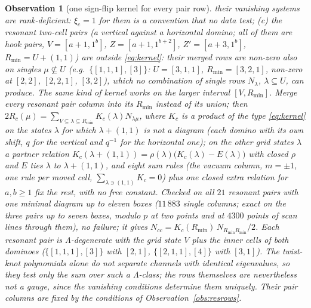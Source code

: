 \documentclass[11pt]{article}
\newtheorem{observation}{Observation}
\newcommand{\Lam}{\Lambda}
\begin{document}
\begin{observation}[one sign-flip kernel for every pair row]
their vanishing systems are rank-deficient: $\xi_c=1$ for them is a convention that no data test; (c) the
\emph{resonant} two-cell pairs (a vertical against a horizontal domino; all of them are hook pairs, $V=[a+1,1^b]$,
$Z=[a+1,1^{b+2}]$, $Z'=[a+3,1^b]$, $R_{\min}=U+(1,1)$) are outside \eqref{eq:kernel}: their merged rows are non-zero also
on singles $\mu\not\subseteq U$ (e.g.\ $\{[1,1,1],[3]\}$: $U=[3,1,1]$, $R_{\min}=[3,2,1]$, non-zero at $[2,2]$, $[2,2,1]$,
$[3,2]$), which no combination of single rows $N_\lambda$, $\lambda\subseteq U$, can produce.  The same kind of kernel
works on the larger interval $[V,R_{\min}]$.  Merge every resonant pair column into its $R_{\min}$ instead of its union;
then $2R_c(\mu)=\sum_{V\subseteq\lambda\subseteq R_{\min}}K_c(\lambda)N_{\lambda\mu}$, where $K_c$ is a product of the type
\eqref{eq:kernel} on the states $\lambda$ for which $\lambda+(1,1)$ is not a diagram (each domino with its own shift, $q$
for the vertical and $q^{-1}$ for the horizontal one); on the other grid states $\lambda$ a partner relation
$K_c(\lambda+(1,1))=\rho(\lambda)\bigl(K_c(\lambda)-E(\lambda)\bigr)$ with closed $\rho$ and $E$ ties $\lambda$ to
$\lambda+(1,1)$, and eight sum rules (the vacuum column, $m=\pm1$, one rule per moved cell,
$\sum_{\lambda\ni(1,1)}K_c=0$) plus one closed extra relation for $a,b\ge1$ fix the rest, with no free constant.  Checked on all $21$ resonant pairs with one minimal diagram up to eleven boxes
($11\,883$ single columns; exact on the three pairs up to seven boxes, modulo $p$ at two points and at $4300$ points of
scan lines through them), no failure; it gives $N_{cc}=K_c(R_{\min})\,N_{R_{\min}R_{\min}}/2$.  Each resonant pair is
$\Lam$-degenerate with the grid state $V$ plus the inner cells of both dominoes ($\{[1,1,1],[3]\}$ with $[2,1]$,
$\{[2,1,1],[4]\}$ with $[3,1]$).  The twist-knot polynomials alone do not separate channels with identical eigenvalues,
so they test only the sum over such a $\Lam$-class; the rows themselves are nevertheless not a gauge, since the
vanishing conditions determine them uniquely.  Their pair columns are fixed by the conditions of
Observation~\ref{obs:resrows}.
\end{observation}
\end{document}
